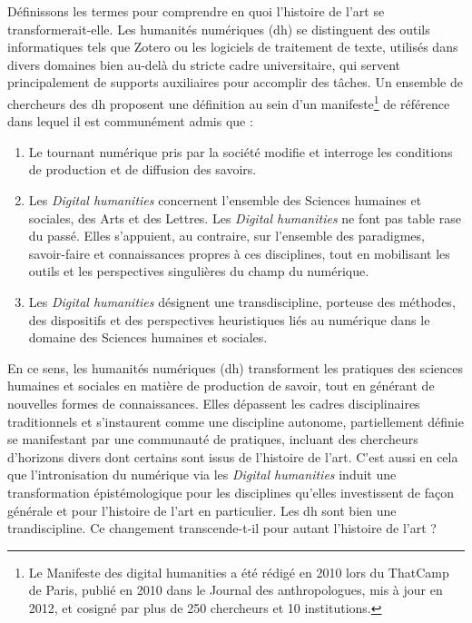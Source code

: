 Définissons les termes pour comprendre en quoi l'histoire de l'art se transformerait-elle. Les humanités numériques (\acrshort{dh}) se distinguent des outils informatiques tels que Zotero ou les logiciels de traitement de texte, utilisés dans divers domaines bien au-delà du stricte cadre universitaire, qui servent principalement de supports auxiliaires pour accomplir des tâches. Un ensemble de chercheurs des \acrshort{dh} proposent une définition au sein d'un manifeste\footnote{Le Manifeste des digital humanities a été rédigé en 2010 lors
du ThatCamp de Paris, publié en 2010 dans le Journal des anthropologues, mis à jour en 2012, et cosigné par plus de 250 chercheurs et 10 institutions.} de référence dans lequel il est communément admis que : 
\begin{displayquote}
    \begin{enumerate}
        \item Le tournant numérique pris par la société modifie et interroge les conditions de production et de diffusion des savoirs.
        \item Les \textit{Digital humanities} concernent l’ensemble des Sciences humaines et sociales, des Arts et des Lettres. Les \textit{Digital humanities} ne font pas table rase du passé. Elles s’appuient, au contraire, sur l’ensemble des paradigmes, savoir-faire et connaissances propres à ces disciplines, tout en mobilisant les outils et les perspectives singulières du champ du numérique.
        \item Les \textit{Digital humanities} désignent une transdiscipline, porteuse des méthodes, des dispositifs et des perspectives heuristiques liés au numérique dans le domaine des Sciences humaines et sociales.
    \end{enumerate}
\end{displayquote}
En ce sens, les humanités numériques (\acrshort{dh}) transforment les pratiques des sciences humaines et sociales en matière de production de savoir, tout en générant de nouvelles formes de connaissances. Elles dépassent les cadres disciplinaires traditionnels et s'instaurent comme une discipline autonome, partiellement définie se manifestant par une communauté de pratiques, incluant des chercheurs d'horizons divers dont certains sont issus de l'histoire de l'art. C'est aussi en cela que l'intronisation du numérique via les \textit{Digital humanities} induit une transformation épistémologique pour les disciplines qu'elles investissent de façon générale et pour l'histoire de l'art en particulier. Les \acrshort{dh} sont bien une trandiscipline. Ce changement transcende-t-il pour autant l'histoire de l'art ?

